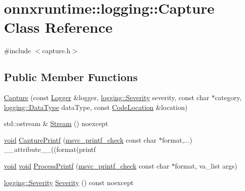 \hypertarget{classonnxruntime_1_1logging_1_1Capture}{}\section{onnxruntime\+:\+:logging\+:\+:Capture Class Reference}
\label{classonnxruntime_1_1logging_1_1Capture}


{\ttfamily \#include $<$capture.\+h$>$}

\subsection*{Public Member Functions}
\begin{DoxyCompactItemize}
\item 
\mbox{\hyperlink{classonnxruntime_1_1logging_1_1Capture_a753b3eeee666d0303d81e0bcae11bc05}{Capture}} (const \mbox{\hyperlink{classonnxruntime_1_1logging_1_1Logger}{Logger}} \&logger, \mbox{\hyperlink{namespaceonnxruntime_1_1logging_a7daeb33e1b0e6a6df8c23d142af78e81}{logging\+::\+Severity}} severity, const char $\ast$category, \mbox{\hyperlink{namespaceonnxruntime_1_1logging_a7342198e47b8ad2717a5d6e28cf68951}{logging\+::\+Data\+Type}} data\+Type, const \mbox{\hyperlink{structonnxruntime_1_1CodeLocation}{Code\+Location}} \&location)
\item 
std\+::ostream \& \mbox{\hyperlink{classonnxruntime_1_1logging_1_1Capture_aff0e9dfa2a1791e6e0b9058207bd64a6}{Stream}} () noexcept
\item 
\mbox{\hyperlink{mlasi_8h_a88f941d423cb2a819b70a1358982b1a6}{void}} \mbox{\hyperlink{classonnxruntime_1_1logging_1_1Capture_a3b7d64d0e021d658c4d0950727b2612c}{Capture\+Printf}} (\mbox{\hyperlink{capture_8h_a7249ae45e189a29f562633e536a1042c}{msvc\+\_\+printf\+\_\+check}} const char $\ast$format,...) \+\_\+\+\_\+attribute\+\_\+\+\_\+((format(printf
\item 
\mbox{\hyperlink{mlasi_8h_a88f941d423cb2a819b70a1358982b1a6}{void}} \mbox{\hyperlink{mlasi_8h_a88f941d423cb2a819b70a1358982b1a6}{void}} \mbox{\hyperlink{classonnxruntime_1_1logging_1_1Capture_acd24ef8d8c31bb342f005baf595f3cc3}{Process\+Printf}} (\mbox{\hyperlink{capture_8h_a7249ae45e189a29f562633e536a1042c}{msvc\+\_\+printf\+\_\+check}} const char $\ast$format, va\+\_\+list args)
\item 
\mbox{\hyperlink{namespaceonnxruntime_1_1logging_a7daeb33e1b0e6a6df8c23d142af78e81}{logging\+::\+Severity}} \mbox{\hyperlink{classonnxruntime_1_1logging_1_1Capture_a647ba6b4406a1d5733e350e134da50fa}{Severity}} () const noexcept

\end{DoxyCompactItemize}
